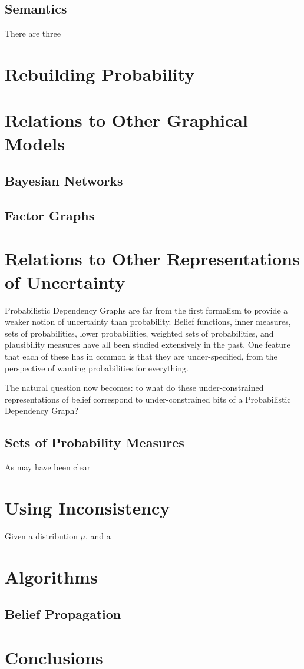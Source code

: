 \documentclass{article}
\newcommand{\modelname}{Probabilistic Dependency Graph}
\begin{document}
	\subsection{Semantics}
	There are three 
	
	\section{Rebuilding Probability}
	
	\section{Relations to Other Graphical Models}
	\subsection{Bayesian Networks}
	\subsection{Factor Graphs}
	
	\section{Relations to Other Representations of Uncertainty}
	\modelname{}s are far from the first formalism to provide a weaker notion of uncertainty than probability. Belief functions, inner measures, sets of probabilities, lower probabilities, weighted sets of probabilities, and plausibility measures have all been studied extensively in the past. One feature that each of these has in common is that they are under-specified, from the perspective of wanting probabilities for everything. 
	
	The natural question now becomes: to what do these under-constrained representations of belief correspond to under-constrained bits of a \modelname?
	
	\subsection{Sets of Probability Measures}
	As may have been clear 
	
	
	
	\section{Using Inconsistency}
	
	Given a distribution $\mu$, and a 
	
	\section{Algorithms}
	\subsection{Belief Propagation}
	
	\section{Conclusions}
\end{document}
